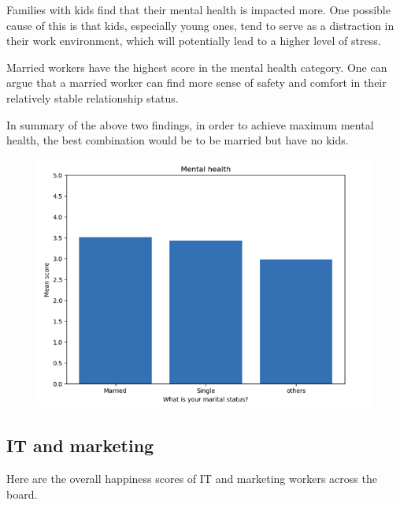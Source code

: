 \documentclass[12pt]{article}
\begin{document}
Families with kids find that their mental health is impacted more. One possible cause of this is that kids, especially young ones, tend to serve as a distraction in their work environment, which will potentially lead to a higher level of stress. 

Married workers have the highest score in the mental health category. One can argue that a married worker can find more sense of safety and comfort in their relatively stable relationship status. 

In summary of the above two findings, in order to achieve maximum mental health, the best combination would be to be married but have no kids.

\begin{figure}[H]
    \centering
    \includegraphics[scale=1]{marriage.png}
    \label{marriage}
\end{figure} 

\subsection*{IT and marketing}

Here are the overall happiness scores of IT and marketing workers across the board.
\end{document}

